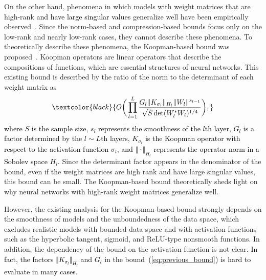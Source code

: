 \documentclass[twoside]{article}
\def\opn{\operatorname}
\def\red#1{\textcolor{black}{#1}}
\def\eqref#1{(\ref{#1})}
\begin{document}
On the other hand, phenomena in which models with weight matrices that are high-rank \red{and have large singular values} generalize well have been empirically observed~\citep{goldblum20}.
Since the norm-based and compression-based bounds focus only on the low-rank and nearly low-rank cases, they cannot describe these phenomena.
To theoretically describe these phenomena, the Koopman-based bound was proposed~\citep{hashimoto2024koopmanbased}.
Koopman operators are linear operators that describe the compositions of functions, which are essential structures of neural networks.
This existing bound is described by the ratio of the norm to the determinant of \red{each} weight matrix as
\begin{align}
\red{O\bigg(\prod_{l=1}^L\frac{G_l\Vert K_{\sigma_l} \Vert_{H_l} \Vert W_l\Vert^{s_{l-1}}}{\sqrt{S}\opn{det}(W_l^*W_l)^{1/4}}\bigg),}\label{eq:previous_bound}
\end{align}
\red{where $S$ is the sample size, $s_l$ represents the smoothness of the $l$th layer, $G_l$ is a factor determined by the $l\sim L$th layers, $K_{\sigma_l}$ is the Koopman operator with respect to the activation function $\sigma_l$, and $\Vert \cdot\Vert_{H_l}$ represents the operator norm in a Sobolev space $H_l$.}
Since the determinant factor appears in the denominator of the bound, even if the weight matrices are high rank and have large singular values, this bound can be small.
The Koopman-based bound theoretically sheds light on why neural networks with high-rank weight matrices generalize well.

However, the existing analysis for the Koopman-based bound strongly depends on the smoothness of models and the unboundedness of the data space, which excludes realistic models with bounded data space and with activation functions such as the hyperbolic tangent, sigmoid, and ReLU-type nonsmooth functions.
In addition, the dependency of the bound on the activation function is not clear.
\red{In fact, the factors $\Vert K_{\sigma_l}\Vert_{H_l}$ and $G_l$ in the bound~\eqref{eq:previous_bound} is hard to evaluate in many cases.}
\end{document}
